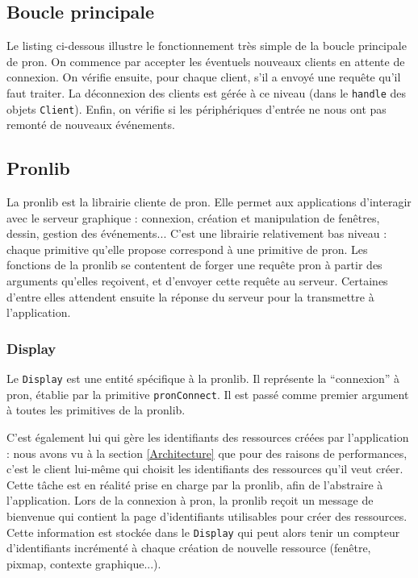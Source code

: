 \subsection{Boucle principale}

Le listing ci-dessous illustre le fonctionnement très simple de la boucle principale de pron. On commence par accepter les éventuels nouveaux clients en attente de connexion. On vérifie ensuite, pour chaque client, s'il a envoyé une requête qu'il faut traiter. La déconnexion des clients est gérée à ce niveau (dans le \verb|handle| des objets \verb|Client|). Enfin, on vérifie si les périphériques d'entrée ne nous ont pas remonté de nouveaux événements.



\subsection{Pronlib}
\label{Pronlib}

La pronlib est la librairie cliente de pron. Elle permet aux applications d'interagir avec le serveur graphique : connexion, création et manipulation de fenêtres, dessin, gestion des événements... C'est une librairie relativement bas niveau : chaque primitive qu'elle propose correspond à une primitive de pron. Les fonctions de la pronlib se contentent de forger une requête pron à partir des arguments qu'elles reçoivent, et d'envoyer cette requête au serveur. Certaines d'entre elles attendent ensuite la réponse du serveur pour la transmettre à l'application.

\subsubsection{Display}

Le \verb|Display| est une entité spécifique à la pronlib. Il représente la ``connexion'' à pron, établie par la primitive \verb|pronConnect|. Il est passé comme premier argument à toutes les primitives de la pronlib.

C'est également lui qui gère les identifiants des ressources créées par l'application : nous avons vu à la section \ref{Architecture} que pour des raisons de performances, c'est le client lui-même qui choisit les identifiants des ressources qu'il veut créer. Cette tâche est en réalité prise en charge par la pronlib, afin de l'abstraire à l'application. Lors de la connexion à pron, la pronlib reçoit un message de bienvenue qui contient la page d'identifiants utilisables pour créer des ressources. Cette information est stockée dans le \verb|Display| qui peut alors tenir un compteur d'identifiants incrémenté à chaque création de nouvelle ressource (fenêtre, pixmap, contexte graphique...).

